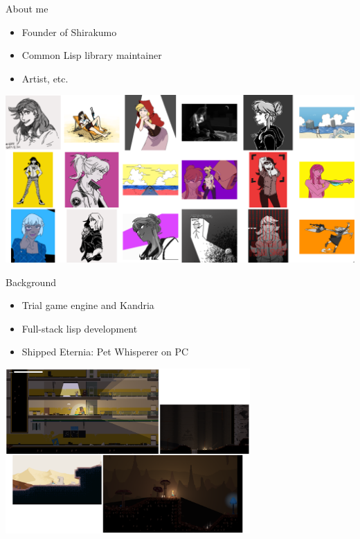\documentclass[14pt,t,aspectratio=169]{beamer}
\renewcommand{\title}[1]{
  {\huge #1} \vskip 0.4cm
}
\begin{document}
\begin{frame}
  \title{About me}
  \begin{itemize}
  \item Founder of Shirakumo
  \item Common Lisp library maintainer
  \item Artist, etc.
  \end{itemize}
  \vfill
  \includegraphics[width=\textwidth]{art.png}
\end{frame}

\begin{frame}
  \title{Background}
  \begin{itemize}
  \item Trial game engine and Kandria
  \item Full-stack lisp development
  \item Shipped Eternia: Pet Whisperer on PC
  \end{itemize}
  \vfill
  \centering
  \includegraphics[width=0.7\textwidth]{screenshot.png}
\end{frame}
\end{document}
